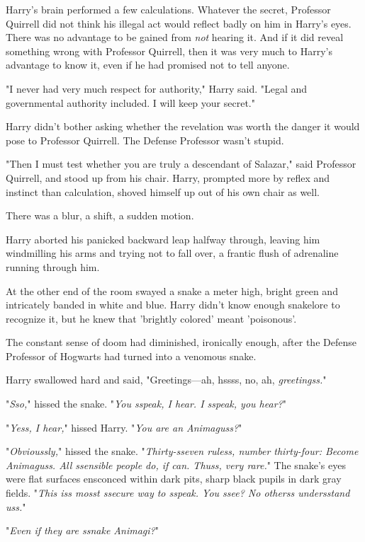 Harry's brain performed a few calculations. Whatever the secret, Professor 
Quirrell did not think his illegal act would reflect badly on him in Harry's 
eyes. There was no advantage to be gained from \emph{not} hearing it. And if it 
did reveal something wrong with Professor Quirrell, then it was very much to 
Harry's advantage to know it, even if he had promised not to tell anyone.

"I never had very much respect for authority," Harry said. "Legal and 
governmental authority included. I will keep your secret."

Harry didn't bother asking whether the revelation was worth the danger it would 
pose to Professor Quirrell. The Defense Professor wasn't stupid.

"Then I must test whether you are truly a descendant of Salazar," said 
Professor Quirrell, and stood up from his chair. Harry, prompted more by reflex 
and instinct than calculation, shoved himself up out of his own chair as well.

There was a blur, a shift, a sudden motion.

Harry aborted his panicked backward leap halfway through, leaving him 
windmilling his arms and trying not to fall over, a frantic flush of adrenaline 
running through him.

At the other end of the room swayed a snake a meter high, bright green and 
intricately banded in white and blue. Harry didn't know enough snakelore to 
recognize it, but he knew that 'brightly colored' meant 'poisonous'.

The constant sense of doom had diminished, ironically enough, after the Defense 
Professor of Hogwarts had turned into a venomous snake.

Harry swallowed hard and said, "Greetings---ah, hssss, no, ah, 
\emph{greetingss.}"

"\emph{Sso,}" hissed the snake. "\emph{You sspeak, I hear. I sspeak, you hear?}"

"\emph{Yess, I hear,}" hissed Harry. "\emph{You are an Animaguss?}"

"\emph{Obvioussly,}" hissed the snake. "\emph{Thirty-sseven ruless, number 
thirty-four: Become Animaguss. All ssensible people do, if can. Thuss, very 
rare.}" The snake's eyes were flat surfaces ensconced within dark pits, sharp 
black pupils in dark gray fields. "\emph{This iss mosst ssecure way to sspeak. 
You ssee? No otherss undersstand uss.}"

"\emph{Even if they are ssnake Animagi?}"

